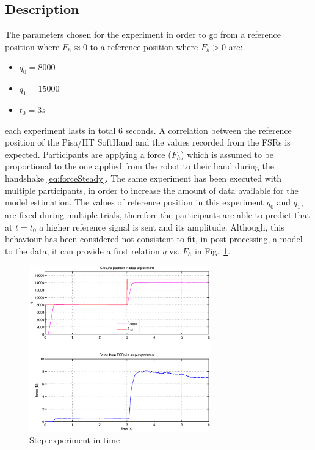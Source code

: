 \subsection{Description}
The parameters chosen for the experiment in order to go from a reference position where $F_h \approx 0$ to a reference position where $F_h > 0$ are:
\begin{itemize}
\item $q_0 = 8000 $
\item $q_1 = 15000$
\item $t_0 = 3s$
\end{itemize}
each experiment lasts in total 6 seconds. A correlation between the reference position of the Pisa/IIT SoftHand and the values recorded from the FSRs is expected. Participants are applying a force ($F_{h}$) which is assumed to be proportional to the one applied from the robot to their hand during the handshake \eqref{eq:forceSteady}.
The same experiment has been executed with multiple participants, in order to increase the amount of data available for the model estimation. The values of reference position in this experiment $q_{0}$ and $q_{1}$, are fixed during multiple trials, therefore the participants are able to predict that at $t=t_0$ a higher reference signal is sent and its amplitude. Although, this behaviour has been considered not consistent to fit, in post processing, a model to the data, it can provide a first relation $q$ vs. $F_h$ in Fig.~\ref{Fig:step}.
%
%
\begin{figure}[h]
\centering
\includegraphics[width=0.7\textwidth]{Figure/step.eps}
  \caption{Step experiment in time}
  \label{Fig:step}
\end{figure}


